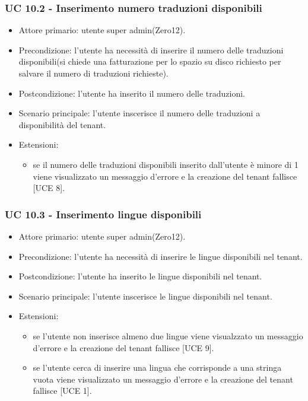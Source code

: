     \subsubsection{UC 10.2 - Inserimento numero traduzioni disponibili}
        \begin{itemize}
            \item Attore primario: utente super admin(Zero12).
            \item Precondizione: l'utente ha necessità di inserire il numero delle traduzioni disponibili(si chiede una fatturazione per lo spazio su disco richiesto per salvare il numero di traduzioni richieste).
            \item Postcondizione: l'utente ha inserito il numero delle traduzioni.
            \item Scenario principale: l'utente inscerisce il numero delle traduzioni a disponibilità del tenant.
            \item Estensioni: 
                \begin{itemize}
                    \item se il numero delle traduzioni disponibili inserito dall'utente è minore di 1 viene visualizzato un messaggio d'errore e la creazione del tenant fallisce [UCE 8].
                \end{itemize}
        \end{itemize}
    \subsubsection{UC 10.3 - Inserimento lingue disponibili}
        \begin{itemize}
            \item Attore primario: utente super admin(Zero12).
            \item Precondizione: l'utente ha necessità di inserire le lingue disponibili nel tenant.
            \item Postcondizione: l'utente ha inserito le lingue disponibili nel tenant.
            \item Scenario principale: l'utente inscerisce le lingue disponibili nel tenant.
            \item Estensioni: 
                \begin{itemize}
                    \item se l'utente non inserisce almeno due lingue viene visualzzato un messaggio d'errore e la creazione del tenant fallisce [UCE 9].
                    \item se l'utente cerca di inserire una lingua che corrisponde a una stringa vuota viene visualizzato un messaggio d'errore e la creazione del tenant fallisce [UCE 1].
                \end{itemize}
        \end{itemize}
